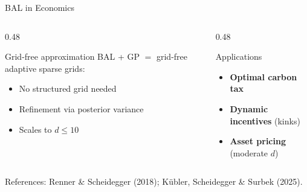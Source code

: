 \documentclass[aspectratio=169,11pt]{beamer}
\begin{document}
\begin{frame}{BAL in Economics}
\begin{columns}[T]
\begin{column}{0.48\textwidth}
\begin{block}{Grid-free approximation}
BAL + GP $=$ grid-free adaptive sparse grids:
\begin{itemize}\setlength{\itemsep}{1pt}
  \item No structured grid needed
  \item Refinement via posterior variance
  \item Scales to $d \leq 10$
\end{itemize}
\end{block}
\end{column}
\begin{column}{0.48\textwidth}
\begin{block}{Applications}
\begin{itemize}\setlength{\itemsep}{1pt}
  \item \textbf{Optimal carbon tax}
  \item \textbf{Dynamic incentives} (kinks)
  \item \textbf{Asset pricing} (moderate $d$)
\end{itemize}
\end{block}
\end{column}
\end{columns}

\vspace{0.3cm}
{\small References: Renner \& Scheidegger (2018); K\"ubler, Scheidegger \& Surbek (2025).}
\end{frame}
\end{document}
